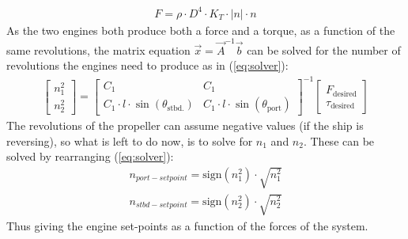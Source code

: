 \documentclass{ifacconf}
\begin{document}
\begin{align}
F = \rho \cdot D^4 \cdot K_T \cdot |n| \cdot n
\label{eq:soren}
\end{align}
As the two engines both produce both a force and a torque, as a function of the same revolutions, the matrix equation $\vec{x} = \vec{A}^{-1}\vec{b}$ can be solved for the number of revolutions the engines need to produce as in (\ref{eq:solver}):
\begin{align}
\begin{bmatrix}
n_1^2\\
n_2^2
\end{bmatrix} = \begin{bmatrix}
C_1 & C_1\\
C_1 \cdot l \cdot \sin(\theta_\text{stbd.}) & C_1 \cdot l \cdot \sin(\theta_\text{port})
\end{bmatrix}^{-1}\begin{bmatrix}
F_\text{desired}\\
\tau_\text{desired}
\end{bmatrix}\label{eq:solver}
\end{align}
The revolutions of the propeller can assume negative values (if the ship is reversing), so what is left to do now, is to solve for $n_1$ and $n_2$. These can be solved by rearranging (\ref{eq:solver}):
\begin{align}
n_{port-setpoint} = \text{sign}(n_1^2) \cdot \sqrt{n_1^2}\\
n_{stbd-setpoint} = \text{sign}(n_2^2) \cdot \sqrt{n_2^2}
\end{align}
Thus giving the engine set-points as a function of the forces of the system.
\end{document}
